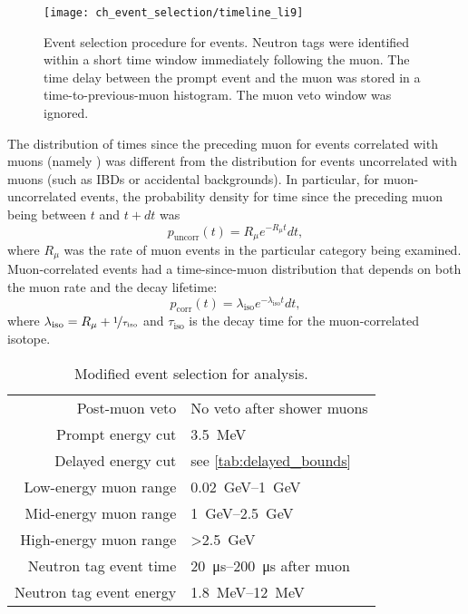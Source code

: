 \begin{figure}
    \centering
    \texttt{[image: ch\_event\_selection/timeline\_li9]}
    \caption[\li{}/\he{} event selection]{
        Event selection procedure for \li{} events.
        Neutron tags were identified within a short time window
        immediately following the muon.
        The time delay between the prompt event and the muon
        was stored in a time-to-previous-muon histogram.
        The muon veto window was ignored.
    }
    \label{fig:li9_timeline}
\end{figure}

The distribution of times since the preceding muon
for events correlated with muons (namely \li{})
was different from the distribution for events uncorrelated with muons
(such as IBDs or accidental backgrounds).
In particular, for muon-uncorrelated events,
the probability density for time since the preceding muon
being between $t$ and $t + dt$ was \cite{chris_li9}
\begin{equation}\label{eq:li9_muon_uncorr}
    p_\text{uncorr}(t) = R_\mu e^{-R_\mu t}dt,
\end{equation}
where $R_\mu$ was the rate of muon events in the particular category being examined.
Muon-correlated events had a time-since-muon distribution
that depends on both the muon rate and the decay lifetime:
\begin{equation}\label{eq:li9_muon_corr}
    p_\text{corr}(t) = \lambda_\text{iso} e^{-\lambda_\text{iso} t}dt,
\end{equation}
where $\lambda_\text{iso} = R_\mu + \nicefrac{1}{\tau_\text{iso}}$
and $\tau_\text{iso}$ is the decay time
for the muon-correlated isotope.

\begin{table}
    \centering
    \caption[\li{}/\he{} event selection]{Modified event selection for \li{} analysis.}
    \label{tab:li9}
    \begin{tabular}[t]{rl}
        \toprule
        Post-muon veto & No veto after shower muons \\
        Prompt energy cut & \SI{3.5}{\MeV} \\
        Delayed energy cut & see \cref{tab:delayed_bounds} \\
        Low-energy muon range & \SIrange{0.02}{1}{\GeV} \\
        Mid-energy muon range & \SIrange{1}{2.5}{\GeV} \\
        High-energy muon range & \SI{>2.5}{\GeV} \\
        Neutron tag event time & \SIrange{20}{200}{\us} after muon \\
        Neutron tag event energy & \SIrange{1.8}{12}{\MeV} \\
        \bottomrule
    \end{tabular}
\end{table}

